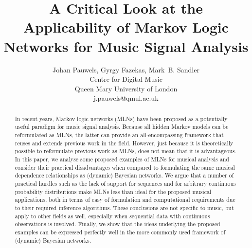 \documentclass[letterpaper]{article} %
\title{A Critical Look at the Applicability of Markov Logic Networks for Music Signal Analysis}
\author{Johan Pauwels, Gyrgy Fazekas, Mark~B. Sandler\\ %
Centre for Digital Music\\
Queen Mary University of London\\
j.pauwels@qmul.ac.uk %
}
\begin{document}
\maketitle

\begin{abstract}
In recent years, Markov logic networks (MLNs) have been proposed as a potentially useful paradigm for music signal analysis. Because all hidden Markov models can be reformulated as MLNs, the latter can provide an all-encompassing framework that reuses and extends previous work in the field. However, just because it is theoretically possible to reformulate previous work as MLNs, does not mean that it is advantageous. In this paper, we analyse some proposed examples of MLNs for musical analysis and consider their practical disadvantages when compared to formulating the same musical dependence relationships as (dynamic) Bayesian networks. We argue that a number of practical hurdles such as the lack of support for sequences and for arbitrary continuous probability distributions make MLNs less than ideal for the proposed musical applications, both in terms of easy of formulation and computational requirements due to their required inference algorithms. These conclusions are not specific to music, but apply to other fields as well, especially when sequential data with continuous observations is involved.
Finally, we show that the ideas underlying the proposed examples can be expressed perfectly well in the more commonly used framework of (dynamic) Bayesian networks.
\end{abstract}
\end{document}
